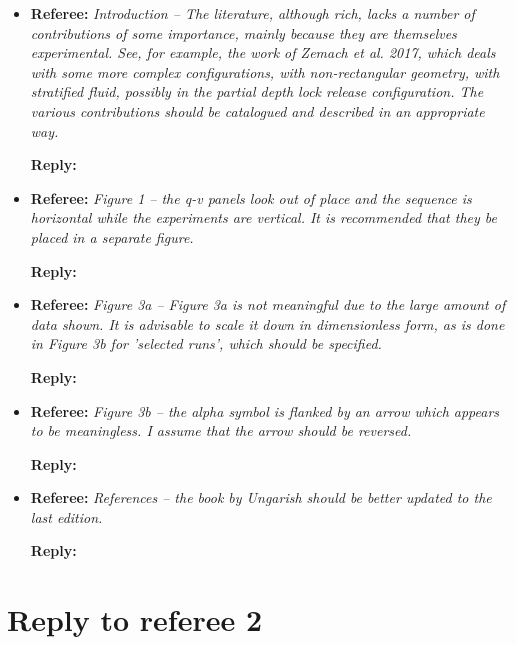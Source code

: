 \documentclass[12pt]{article}
\newcommand{\MinorReply}[3]{\filbreak\noindent
\textbf{Referee:}
\emph{#1 -- #2}

\textbf{Reply:} {\color{blue}{#3}}
}
\begin{document}
\begin{itemize}
    \item \MinorReply{Introduction}{The literature, although rich, lacks a number of contributions of some importance, mainly because they are themselves experimental. See, for example, the work of Zemach et al. 2017, which deals with some more complex configurations, with non-rectangular geometry, with stratified fluid, possibly in the partial depth lock release configuration. The various contributions should be catalogued and described in an appropriate way.}{The introduction has been rewritten according to various comments of the referees and other readers. Some references have been added. Note that we can not provide an extensive catalog of the complete literature related to gravity currents in such an introduction, bound to have a manuscript of reasonable length. We have then focused on the literature that shares the most scientific objectives with the present contribution.}

    \item \MinorReply{Figure 1}{the q-v panels look out of place and the sequence is horizontal while the experiments are vertical. It is recommended that they be placed in a separate figure.}{There are already many figures compared to the text length, and we do not wish to emphasize the numerical simulations by adding a dedicated figure. Hence, we modified figure 1 to better separate the q-v panels from the rest.}

    \item \MinorReply{Figure 3a}{Figure 3a is not meaningful due to the large amount of data shown. It is advisable to scale it down in dimensionless form, as is done in Figure 3b for 'selected runs', which should be specified.}{Done.}

    \item \MinorReply{Figure 3b}{the alpha symbol is flanked by an arrow which appears to be meaningless. I assume that the arrow should be reversed.}{The flanking arrows have been removed, and the figure caption has been modified accordingly.}

    \item \MinorReply{References}{the book by Ungarish should be better updated to the last edition.}{Done.}
\end{itemize}


\newpage
\section{Reply to referee 2}
\end{document}
